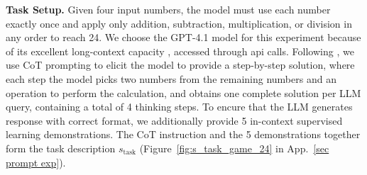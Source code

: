\documentclass{article} %
\newcommand{\0}{\mathbf{0}}
\begin{document}
\textbf{Task Setup.} Given four input numbers, the model must use each number exactly once and apply only addition, subtraction, multiplication, or division in any order to reach 24. 
We choose the GPT-4.1 model for this experiment because of its excellent long-context capacity \citep{openai2025gpt4.1}, accessed through api calls. 
Following \cite{tot}, we use CoT prompting to elicit the model to provide a step-by-step solution, where each step the model picks two numbers from the remaining numbers and an operation to perform the calculation, and obtains one complete solution per LLM query, containing a total of 4 thinking steps.
To encure that the LLM generates response with correct format,
we additionally provide 5 in-context supervised learning demonstrations.
The CoT instruction and the 5 demonstrations together form the task description $s_\text{task}$ (Figure~\ref{fig:s_task_game_24} in App.~\ref{sec prompt exp}). \\
\end{document}
